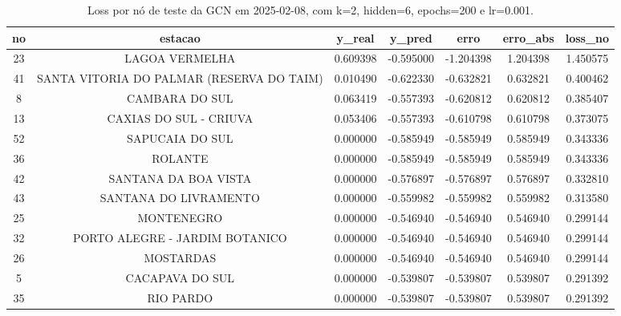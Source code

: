 \begin{table}[h]
\centering
\caption{Loss por nó de teste da GCN em 2025-02-08, com k=2, hidden=6, epochs=200 e lr=0.001.}
\label{tab:gcn_loss_nodes_k2_hidden6}
\begin{tabular}{ccccccc}
\toprule
no & estacao & y\_real & y\_pred & erro & erro\_abs & loss\_no \\
\midrule
23 & LAGOA VERMELHA & 0.609398 & -0.595000 & -1.204398 & 1.204398 & 1.450575 \\
41 & SANTA VITORIA DO PALMAR (RESERVA DO TAIM) & 0.010490 & -0.622330 & -0.632821 & 0.632821 & 0.400462 \\
8 & CAMBARA DO SUL & 0.063419 & -0.557393 & -0.620812 & 0.620812 & 0.385407 \\
13 & CAXIAS DO SUL - CRIUVA & 0.053406 & -0.557393 & -0.610798 & 0.610798 & 0.373075 \\
52 & SAPUCAIA DO SUL & 0.000000 & -0.585949 & -0.585949 & 0.585949 & 0.343336 \\
36 & ROLANTE & 0.000000 & -0.585949 & -0.585949 & 0.585949 & 0.343336 \\
42 & SANTANA DA BOA VISTA & 0.000000 & -0.576897 & -0.576897 & 0.576897 & 0.332810 \\
43 & SANTANA DO LIVRAMENTO & 0.000000 & -0.559982 & -0.559982 & 0.559982 & 0.313580 \\
25 & MONTENEGRO & 0.000000 & -0.546940 & -0.546940 & 0.546940 & 0.299144 \\
32 & PORTO ALEGRE - JARDIM BOTANICO & 0.000000 & -0.546940 & -0.546940 & 0.546940 & 0.299144 \\
26 & MOSTARDAS & 0.000000 & -0.546940 & -0.546940 & 0.546940 & 0.299144 \\
5 & CACAPAVA DO SUL & 0.000000 & -0.539807 & -0.539807 & 0.539807 & 0.291392 \\
35 & RIO PARDO & 0.000000 & -0.539807 & -0.539807 & 0.539807 & 0.291392 \\
\bottomrule
\end{tabular}
\end{table}
